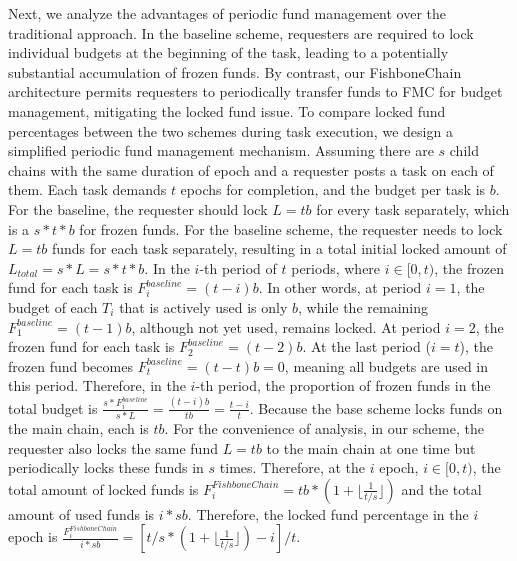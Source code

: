 {{Next, we analyze the advantages of periodic fund management over the traditional approach. In the baseline scheme, requesters are required to lock individual budgets at the beginning of the task, leading to a potentially substantial accumulation of frozen funds. By contrast, our FishboneChain architecture permits requesters to periodically transfer funds to FMC for budget management, mitigating the locked fund issue. To compare locked fund percentages between the two schemes during task execution, we design a simplified periodic fund management mechanism. Assuming there are $s$ child chains with the same duration of epoch and a requester posts a task on each of them. Each task demands $t$ epochs for completion, and the budget per task is $b$. For the baseline, the requester should lock $L=tb$ for every task separately, which is a $s*t*b$ for frozen funds. For the baseline scheme, the requester needs to lock $L = tb$ funds for each task separately, resulting in a total initial locked amount of $L_{total} = s * L = s * t * b$. In the $i$-th period of $t$ periods, where $i \in [0,t)$, the frozen fund for each task is $F^{baseline}_i = (t-i)b$. In other words, at period $i=1$, the budget of each $T_i$ that is actively used is only $b$, while the remaining $F^{baseline}_1 = (t-1)b$, although not yet used, remains locked. At period $i=2$, the frozen fund for each task is $F^{baseline}_2 = (t-2)b$. At the last period ($i=t$), the frozen fund becomes $F^{baseline}_t = (t-t)b=0$, meaning all budgets are used in this period. Therefore, in the $i$-th period, the proportion of frozen funds in the total budget is $\frac{s*F^{baseline}_i}{s*L} = \frac{(t-i)b}{tb} = \frac{t-i}{t}$. Because the base scheme locks funds on the main chain, each is $tb$. For the convenience of analysis, in our scheme, the requester also locks the same fund $L=tb$ to the main chain at one time but periodically locks these funds in $s$ times. Therefore, at the $i$ epoch, $i \in [0,t)$, the total amount of locked funds is $F^{FishboneChain}_i= tb * (1+ \lfloor \frac{1}{t/s} \rfloor) $ and the total amount of used funds is $i * sb$. Therefore, the locked fund percentage in the $i$ epoch is $\frac{F^{FishboneChain}_i}{i * sb}=[t/s * (1+ \lfloor \frac{1}{t/s} \rfloor) - i]/{t}$.

}}
